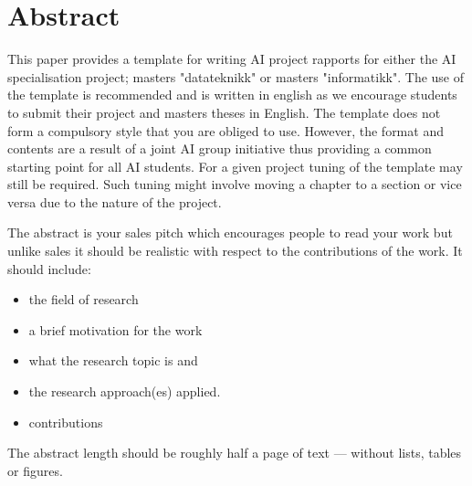 \section*{Abstract}

This paper provides a template for writing AI project rapports for either the AI specialisation project; masters "datateknikk" or masters "informatikk". The use of the template is recommended and is written in english as we encourage students to submit their project and masters theses in English.
The template does not form a compulsory style that you are obliged to use. However, the format and contents are a result of a joint AI group initiative thus providing a common starting point for all AI students. For a given project tuning of the template may still be required. Such tuning might involve moving a chapter to a section or vice versa due to the nature of the project.

The abstract is your sales pitch which encourages people to read your work but unlike sales it should be realistic with respect to the contributions of the work. It should include:
\begin{itemize}
    \item the field of research
    \item a brief motivation for the work
    \item what the research topic is and
    \item the research approach(es) applied.
    \item contributions
\end{itemize}

The abstract length should be roughly half a page of text --- without lists, tables or figures.
